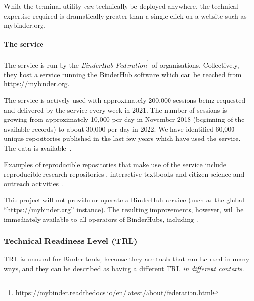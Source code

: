 While the \repotodocker{} terminal utility \emph{can} technically be deployed anywhere,
the technical expertise required is dramatically greater than a single click on a website such as mybinder.org.

\paragraph{The \mybinder{} service}\label{sec:mybinder}


The \mybinder{} service is run by the \emph{BinderHub
Federation}\footnote{\url{https://mybinder.readthedocs.io/en/latest/about/federation.html}}
of organisations. Collectively, they host a service running the BinderHub software
which can be reached from \url{https://mybinder.org}.

The service is actively used with approximately 200,000 sessions being
requested and delivered by the \mybinder{} service every week in 2021. The number
of sessions is growing from approximately 10,000 per day in November 2018
(beginning of the available records) to about 30,000 per day in 2022. We have
identified 60,000 unique repositories published in the last few years which have
used the \mybinder{} service. The data is available~\cite{mybinder-archive}.

Examples of reproducible repositories that make use of the \mybinder service
include reproducible research repositories
\cite{GitHubRepoExampleAlbert2016,Beg2021}, interactive textbooks
\cite{Fangohr2022,Zeller2022} and citizen science and outreach activities
\cite{ligo-open-science,OSCOVIDA2022}.

This \TheProject{} project will not provide or operate a BinderHub service (such as the global
``\url{https://mybinder.org}'' instance). The resulting improvements, however, will be
immediately available to all operators of BinderHubs, including \mybinder{}.



\subsubsection{Technical Readiness Level (TRL)}

TRL is unusual for Binder tools, because they are tools that can be used in many ways,
and they can be described as having a different TRL \emph{in different contexts}.

